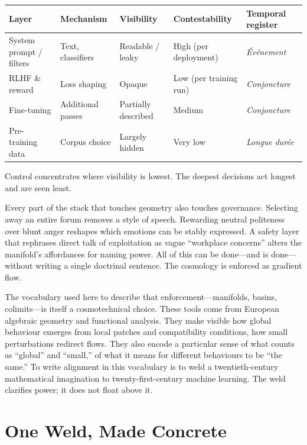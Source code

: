 \documentclass[12pt,a4paper]{article}
\begin{document}
\begin{formalbox}[title={Depth and control}]
\begin{center}
\begin{tabular}{@{}lllll@{}}
\toprule
\textbf{Layer} & \textbf{Mechanism} & \textbf{Visibility} & \textbf{Contestability} & \textbf{Temporal register} \\
\midrule
System prompt / filters & Text, classifiers & Readable / leaky & High (per deployment) & \emph{\'Ev\'enement} \\
RLHF \& reward & Loss shaping & Opaque & Low (per training run) & \emph{Conjoncture} \\
Fine-tuning & Additional passes & Partially described & Medium & \emph{Conjoncture} \\
Pre-training data & Corpus choice & Largely hidden & Very low & \emph{Longue dur\'ee} \\
\bottomrule
\end{tabular}
\end{center}
\medskip
Control concentrates where visibility is lowest. The deepest decisions act longest and are seen least.
\end{formalbox}

Every part of the stack that touches geometry also touches governance. Selecting away an entire forum removes a style of speech. Rewarding neutral politeness over blunt anger reshapes which emotions can be stably expressed. A safety layer that rephrases direct talk of exploitation as vague ``workplace concerns'' alters the manifold's affordances for naming power. All of this can be done---and is done---without writing a single doctrinal sentence. The cosmology is enforced as gradient flow.

The vocabulary used here to describe that enforcement---manifolds, basins, colimits---is itself a cosmotechnical choice. These tools come from European algebraic geometry and functional analysis. They make visible how global behaviour emerges from local patches and compatibility conditions, how small perturbations redirect flows. They also encode a particular sense of what counts as ``global'' and ``small,'' of what it means for different behaviours to be ``the same.'' To write alignment in this vocabulary is to weld a twentieth-century mathematical imagination to twenty-first-century machine learning. The weld clarifies power; it does not float above it.

\section{One Weld, Made Concrete}
\end{document}
